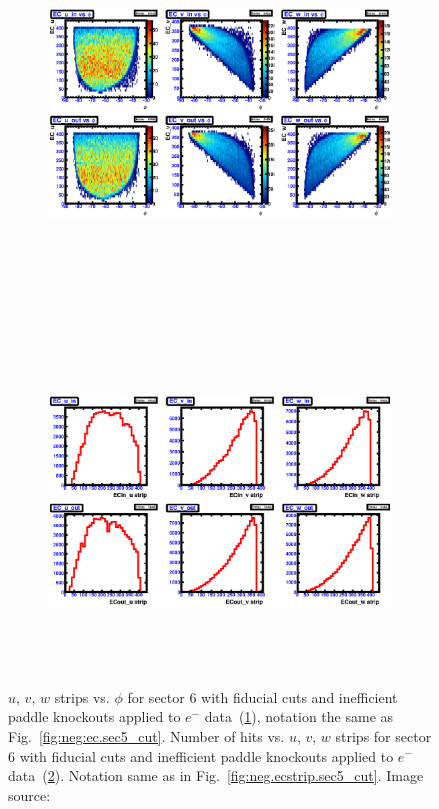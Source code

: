\begin{figure}[htpb]
  \centering
  \begin{subfigure}[b]{\figwidth}
  \includegraphics[width=\figwidth, height=3.5in,valign=c]{figures/calib/ec/pim_ecuvw_phi_afterGeoFid_sec6.eps}\caption{}\label{fig:EC_III_VI}
  \end{subfigure}%
  \\
  \begin{subfigure}[b]{\figwidth}
  \includegraphics[width=\figwidth, height=3.5in,valign=c]{figures/calib/ec/pim_ecuvw_afterGeoFid_sec6.eps}\caption{}\label{fig:EC_IV_VI}
  \end{subfigure}%
      \caption { $u$, $v$, $w$ strips vs. $\phi$ for sector 6 with fiducial cuts and inefficient paddle knockouts applied to $e^-$ data~(\ref{fig:EC_III_VI}), notation the same as Fig.~\ref{fig:neg:ec.sec5_cut}. Number of hits vs.  $u$, $v$, $w$ strips for sector 6 with fiducial cuts and inefficient paddle knockouts applied to $e^-$ data~(\ref{fig:EC_IV_VI}). Notation same as in Fig.~\ref{fig:neg.ecstrip.sec5_cut}. Image source:~\cite{clas.thesis.kunkel}}
        \label{fig:EC_cut_VI}
\end{figure}


